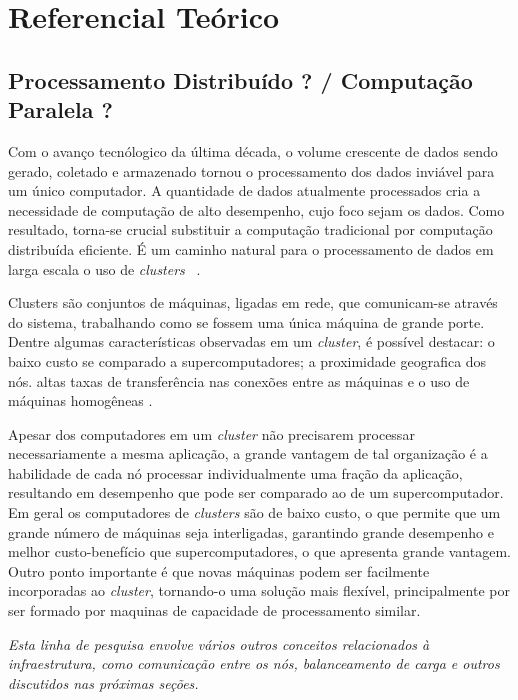 \chapter{Referencial Teórico}
\label{cap:referencial}

 
\section{Processamento Distribuído ? / Computação Paralela ?}


Com o avanço tecnólogico da última década, o volume crescente de dados sendo gerado, coletado e armazenado tornou o processamento dos dados inviável para um único computador. A quantidade de dados atualmente processados cria a necessidade de computação de alto desempenho, cujo foco sejam os dados.  Como resultado, torna-se crucial substituir a computação tradicional por computação distribuída eficiente. 
É um caminho natural para o processamento de dados em larga escala o uso de \textit{clusters} ~\cite{Lin:2010}.

Clusters são conjuntos de máquinas, ligadas em rede, que comunicam-se através do sistema, trabalhando como se fossem uma única máquina de grande porte. 
Dentre algumas características observadas em um \textit{cluster}, é possível destacar: o baixo custo se comparado a supercomputadores; a proximidade geografica dos nós. altas taxas de transferência nas conexões entre as máquinas e o uso de máquinas homogêneas \cite{Toth:2008}.

Apesar dos computadores em um \textit{cluster} não precisarem processar necessariamente a mesma aplicação, a grande vantagem de tal organização é a habilidade de cada nó processar individualmente uma fração da aplicação, resultando em desempenho que pode ser comparado ao de um supercomputador.
Em geral os computadores de \textit{clusters} são de baixo custo, o que permite que um grande número de máquinas seja interligadas, garantindo grande desempenho e melhor custo-benefício que supercomputadores, o que apresenta grande vantagem. Outro ponto importante é que novas máquinas podem ser facilmente incorporadas  ao \textit{cluster}, tornando-o uma solução mais flexível, principalmente por ser formado por maquinas de capacidade de processamento similar.

\textit{Esta linha de pesquisa envolve vários outros conceitos relacionados à infraestrutura, como comunicação entre os nós, balanceamento de carga e outros discutidos nas próximas seções.}



